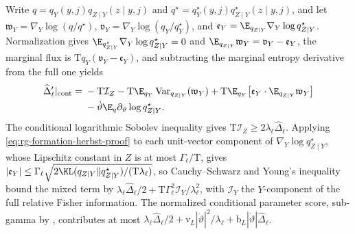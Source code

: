 Write \(q=q_Y(y,j)q_{Z\mid Y}(z\mid y,j)\) and
\(q^\star=q^\star_Y(y,j)q^\star_{Z\mid Y}(z\mid y,j)\), and let
\(\mathfrak w_Y=\nabla_Y\log(q/q^\star)\),
\(\mathfrak v_Y=\nabla_Y\log(q_Y/q^\star_Y)\), and
\(\mathfrak e_Y=\E_{q_{Z\mid Y}}\nabla_Y\log q^\star_{Z\mid Y}\). Normalization
gives \(\E_{q^\star_{Z\mid Y}}\nabla_Y\log q^\star_{Z\mid Y}=0\) and
\(\E_{q_{Z\mid Y}}\mathfrak w_Y=\mathfrak v_Y-\mathfrak e_Y\), the marginal
flux is \(\mathrm Tq_Y(\mathfrak v_Y-\mathfrak e_Y)\), and subtracting the
marginal entropy derivative from the full one yields
\begin{align}
 \widehat\Delta_\ell'|_{\mathrm{cont}}
 ={}&-\mathrm T\mathcal I_Z
      -\mathrm T\E_{q_Y}\operatorname{Var}_{q_{Z\mid Y}}(\mathfrak w_Y)
      +\mathrm T\E_{q_Y}\bigl[\mathfrak e_Y\cdot\E_{q_{Z\mid Y}}\mathfrak w_Y\bigr]
 \notag\\
 &-\dot\vartheta \E_q\partial_\vartheta\log q^\star_{Z\mid Y}.
 \label{eq:rg-formation-conditional-balance}
\end{align}
The conditional logarithmic Sobolev inequality gives
\(\mathrm T\mathcal I_Z\ge2\lambda_\ell\widehat\Delta_\ell\). Applying
\cref{eq:rg-formation-herbst-proof} to each unit-vector component of
\(\nabla_Y\log q^\star_{Z\mid Y}\), whose Lipschitz constant in \(Z\) is at most
\(\Gamma_\ell/\mathrm T\), gives
\(|\mathfrak e_Y|\le\Gamma_\ell\sqrt{2\KL(q_{Z\mid Y}\Vert q^\star_{Z\mid Y})/(\mathrm T\lambda_\ell)}\),
so Cauchy--Schwarz and Young's inequality bound the mixed term by
\(\lambda_\ell\widehat\Delta_\ell/2+\mathrm T\Gamma_\ell^2\mathcal I_Y/\lambda_\ell^2\),
with \(\mathcal I_Y\) the \(Y\)-component of the full relative Fisher
information. The normalized conditional parameter score, sub-gamma by
, contributes at most
\(\lambda_\ell\widehat\Delta_\ell/2+\mathrm v_L|\dot\vartheta|^2/\lambda_\ell
+\mathrm b_L|\dot\vartheta|\widehat\Delta_\ell\).

